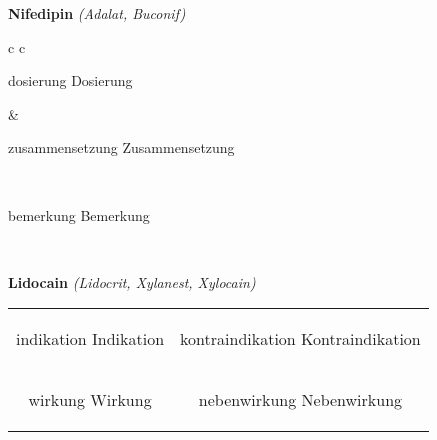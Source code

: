\documentclass[12pt]{beamer}
\begin{document}
\begin{frame}{
    \textbf{Nifedipin}
    \textit{(Adalat, Buconif)}
}
    \begin{tabular}{c c}
        \begin{beamercolorbox}[wd=\boxwidth\textwidth,ht=\boxheight\textheight,sep=1em]{dosierung}
        Dosierung
        \end{beamercolorbox} & 
        \begin{beamercolorbox}[wd=\boxwidth\textwidth,ht=\boxheight\textheight,sep=1em]{zusammensetzung}
        Zusammensetzung
        \end{beamercolorbox} \\
        \begin{beamercolorbox}[wd=\textwidth,ht=\boxheight\textheight,sep=1em]{bemerkung}
        Bemerkung
        \end{beamercolorbox} \\
    \end{tabular}
\end{frame}

\begin{frame}{
    \textbf{Lidocain}
    \textit{(Lidocrit, Xylanest, Xylocain)}
}
    \begin{tabular}{c c}
        \begin{beamercolorbox}[wd=\boxwidth\textwidth,ht=\boxheight\textheight,sep=1em]{indikation}
        Indikation
        \end{beamercolorbox} & 
        \begin{beamercolorbox}[wd=\boxwidth\textwidth,ht=\boxheight\textheight,sep=1em]{kontraindikation}
        Kontraindikation 
        \end{beamercolorbox} \\
        \begin{beamercolorbox}[wd=\boxwidth\textwidth,ht=\boxheight\textheight,sep=1em]{wirkung}
        Wirkung
        \end{beamercolorbox} & 
        \begin{beamercolorbox}[wd=\boxwidth\textwidth,ht=\boxheight\textheight,sep=1em]{nebenwirkung}
        Nebenwirkung
        \end{beamercolorbox} \\
    \end{tabular}
\end{frame}
\end{document}
